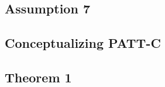 \documentclass[hidelinks,12pt,letterpaper]{article}
\begin{document}

\subsection{Assumption 7}


\subsection{Conceptualizing PATT-C}




\subsection{Theorem 1}
\end{document}
